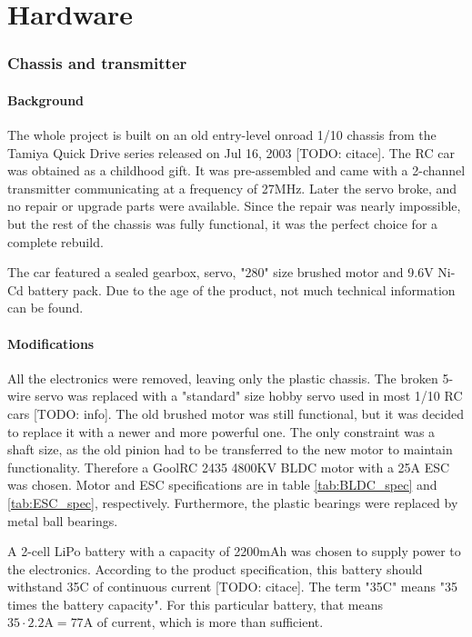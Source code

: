 


\part{Hardware}
\label{chap:hw}


\section{Chassis and transmitter}
\label{sec:hw_base}
\subsection{Background}
The whole project is built on an old entry-level onroad 1/10 chassis from the Tamiya Quick Drive series released on Jul 16, 2003 [TODO: citace]. The RC car was obtained as a childhood gift. It was pre-assembled and came with a 2-channel transmitter communicating at a frequency of 27MHz. Later the servo broke, and no repair or upgrade parts were available. Since the repair was nearly impossible, but the rest of the chassis was fully functional, it was the perfect choice for a complete rebuild.

The car featured a sealed gearbox, servo, "280" size brushed motor and 9.6V Ni-Cd battery pack. Due to the age of the product, not much technical information can be found. %

\subsection{Modifications}
All the electronics were removed, leaving only the plastic chassis. The broken 5-wire servo was replaced with a "standard" size hobby servo used in most 1/10 RC cars [TODO: info]. The old brushed motor was still functional, but it was decided to replace it with a newer and more powerful one. The only constraint was a shaft size, as the old pinion had to be transferred to the new motor to maintain functionality. Therefore a GoolRC 2435 4800KV BLDC motor with a 25A ESC was chosen. Motor and ESC specifications are in table \ref{tab:BLDC_spec} and \ref{tab:ESC_spec}, respectively. Furthermore, the plastic bearings were replaced by metal ball bearings. %

A 2-cell LiPo battery with a capacity of 2200mAh was chosen to supply power to the electronics. According to the product specification, this battery should withstand 35C of continuous current [TODO: citace]. The term "35C" means "35 times the battery capacity". For this particular battery, that means $35 \cdot 2.2\unit{\A} = 77\unit{\A}$ of current, which is more than sufficient.

